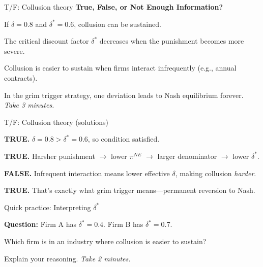 \documentclass[notes,11pt, aspectratio=169]{beamer}
\newenvironment{wideitemize}{\itemize\addtolength{\itemsep}{10pt}}{\enditemize}
\newenvironment{wideenumerate}{\enumerate\addtolength{\itemsep}{10pt}}{\endenumerate}
\begin{document}
\begin{frame}{T/F: Collusion theory}
	\textbf{True, False, or Not Enough Information?}
	\vspace{10pt}
	\begin{wideenumerate}
		\item If $\delta = 0.8$ and $\delta^* = 0.6$, collusion can be sustained.
		\item The critical discount factor $\delta^*$ decreases when the punishment becomes more severe.
		\item Collusion is easier to sustain when firms interact infrequently (e.g., annual contracts).
		\item In the grim trigger strategy, one deviation leads to Nash equilibrium forever.
	\end{wideenumerate}
	\vspace{10pt}
	\centering
	\textit{Take 3 minutes.}
\end{frame}

\begin{frame}{T/F: Collusion theory (solutions)}
	\begin{wideenumerate}
		\item \textbf{TRUE.} $\delta = 0.8 > \delta^* = 0.6$, so condition satisfied.
		\item \textbf{TRUE.} Harsher punishment $\rightarrow$ lower $\pi^{NE}$ $\rightarrow$ larger denominator $\rightarrow$ lower $\delta^*$.
		\item \textbf{FALSE.} Infrequent interaction means lower effective $\delta$, making collusion \textit{harder}.
		\item \textbf{TRUE.} That's exactly what grim trigger means---permanent reversion to Nash.
	\end{wideenumerate}
\end{frame}

\begin{frame}{Quick practice: Interpreting $\delta^*$}
	\begin{wideitemize}
		\item \textbf{Question:} Firm A has $\delta^* = 0.4$. Firm B has $\delta^* = 0.7$.
		\item Which firm is in an industry where collusion is easier to sustain?
		\item Explain your reasoning.
	\end{wideitemize}
	\vspace{10pt}
	\centering
	\textit{Take 2 minutes.}
\end{frame}
\end{document}
